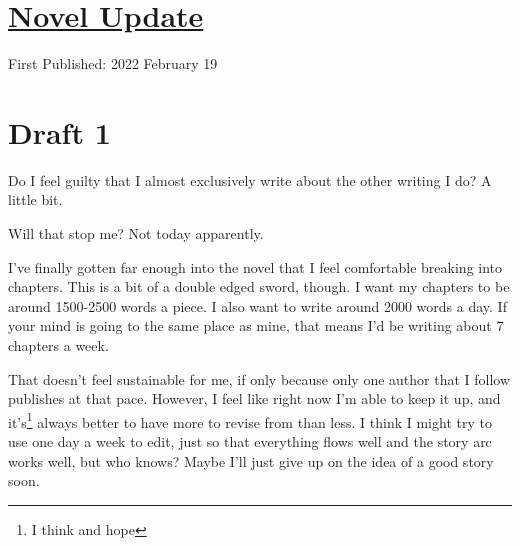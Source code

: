 \documentclass[12pt]{article}[titlepage]
\newcommand{\1}{\={a}}
\newcommand{\2}{\={e}}
\newcommand{\3}{\={\i}}
\newcommand{\4}{\=o}
\newcommand{\5}{\=u}
\newcommand{\6}{\={A}}
\renewcommand{\,}{\textsuperscript{,}}
\begin{document}
\doublespacing
\section{\href{novel-update-3.html}{Novel Update}}
First Published: 2022 February 19

\section{Draft 1}
Do I feel guilty that I almost exclusively write about the other writing I do?
A little bit.

Will that stop me?
Not today apparently.

I've finally gotten far enough into the novel that I feel comfortable breaking into chapters.
This is a bit of a double edged sword, though.
I want my chapters to be around 1500-2500 words a piece.
I also want to write around 2000 words a day.
If your mind is going to the same place as mine, that means I'd be writing about 7 chapters a week.

That doesn't feel sustainable for me, if only because only one author that I follow publishes at that pace.
However, I feel like right now I'm able to keep it up, and it's\footnote{I think and hope} always better to have more to revise from than less.
I think I might try to use one day a week to edit, just so that everything flows well and the story arc works well, but who knows?
Maybe I'll just give up on the idea of a good story soon.
\end{document}
